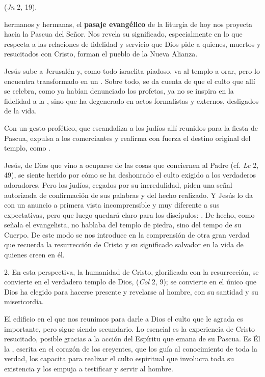 \begin{body}
 (\textit{Jn} 2, 19).

 hermanos y hermanas, el \textbf{pasaje evangélico} de la liturgia de hoy nos proyecta hacia la Pascua del Señor. Nos revela su significado, especialmente en lo que respecta a las relaciones de fidelidad y servicio que Dios pide a quienes, muertos y resucitados con Cristo, forman el pueblo de la Nueva Alianza.

Jesús sube a Jerusalén y, como todo israelita piadoso, va al templo a orar, pero lo encuentra transformado en un . Sobre todo, se da cuenta de que el culto que allí se celebra, como ya habían denunciado los profetas, ya no se inspira en la fidelidad a la , sino que ha degenerado en actos formalistas y externos, desligados de la vida.

Con un gesto profético, que escandaliza a los judíos allí reunidos para la fiesta de Pascua, expulsa a los comerciantes y reafirma con fuerza el destino original del templo, como .

Jesús,  de Dios que vino a ocuparse de las cosas que conciernen al Padre (cf. \textit{Lc} 2, 49), se siente herido por cómo se ha deshonrado el culto exigido a los verdaderos adoradores. Pero los judíos, cegados por su incredulidad, piden una señal autorizada de confirmación de sus palabras y del hecho realizado. Y Jesús lo da con un anuncio a primera vista incomprensible y muy diferente a sus expectativas, pero que luego quedará claro para los discípulos: . De hecho, como señala el evangelista, no hablaba del templo de piedra, sino del tempo de su Cuerpo. De este modo se nos introduce en la comprensión de otra gran verdad que recuerda la resurrección de Cristo y su significado salvador en la vida de quienes creen en él.

2. En esta perspectiva, la humanidad de Cristo, glorificada con la resurrección, se convierte en el verdadero templo de Dios,  (\textit{Col} 2, 9); se convierte en el único  que Dios ha elegido para hacerse presente y revelarse al hombre, con su santidad y su misericordia.

El edificio en el que nos reunimos para darle a Dios el culto que le agrada es importante, pero sigue siendo secundario. Lo esencial es la experiencia de Cristo resucitado, posible gracias a la acción del Espíritu que emana de su Pascua. Es Él la , escrita en el corazón de los creyentes, que los guía al conocimiento de toda la verdad, los capacita para realizar el culto espiritual que involucra toda su existencia y los empuja a testificar y servir al hombre.


\end{body}
